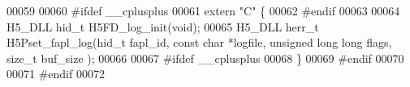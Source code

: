 \begin{DoxyCode}
00059 
00060 \textcolor{preprocessor}{#ifdef \_\_cplusplus}
00061 \textcolor{keyword}{extern} \textcolor{stringliteral}{"C"} \{
00062 \textcolor{preprocessor}{#endif}
00063 
00064 H5\_DLL hid\_t H5FD\_log\_init(\textcolor{keywordtype}{void});
00065 H5\_DLL herr\_t H5Pset\_fapl\_log(hid\_t fapl\_id, \textcolor{keyword}{const} \textcolor{keywordtype}{char} *logfile, \textcolor{keywordtype}{unsigned} \textcolor{keywordtype}{long} \textcolor{keywordtype}{long} flags, \textcolor{keywordtype}{size\_t} buf\_size
      );
00066 
00067 \textcolor{preprocessor}{#ifdef \_\_cplusplus}
00068 \}
00069 \textcolor{preprocessor}{#endif}
00070 
00071 \textcolor{preprocessor}{#endif}
00072 
\end{DoxyCode}
